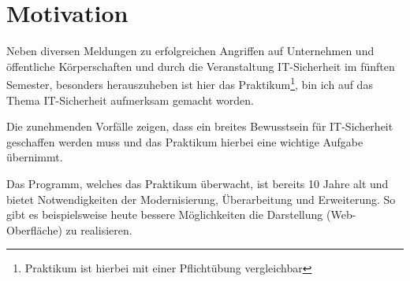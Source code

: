 \section{Motivation}
\label{sec:Motivation}
Neben diversen Meldungen zu erfolgreichen Angriffen auf Unternehmen und öffentliche Körperschaften und durch die Veranstaltung IT-Sicherheit im fünften Semester, besonders herauszuheben ist hier das Praktikum\footnote{Praktikum ist hierbei mit einer Pflichtübung vergleichbar}, bin ich auf das Thema IT-Sicherheit aufmerksam gemacht worden. 

Die zunehmenden Vorfälle zeigen, dass ein breites Bewusstsein für IT-Sicherheit geschaffen werden muss und das Praktikum hierbei eine wichtige Aufgabe übernimmt.

Das Programm, welches das Praktikum überwacht, ist bereits 10 Jahre alt und bietet Notwendigkeiten der Modernisierung, Überarbeitung und Erweiterung. 
So gibt es beispielsweise heute bessere Möglichkeiten die Darstellung (Web-Oberfläche) zu realisieren.